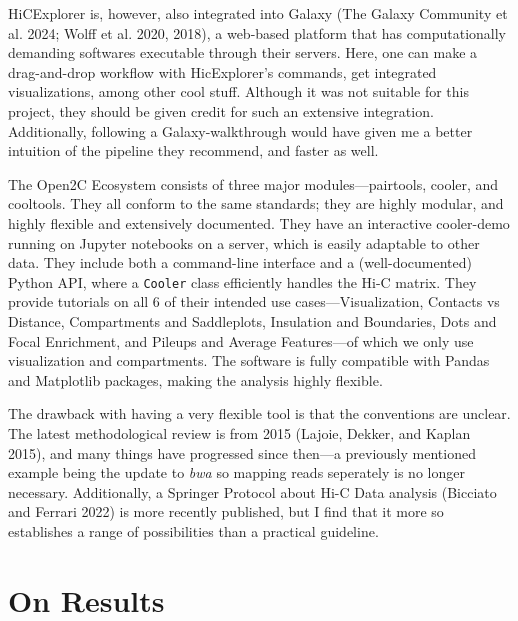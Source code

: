 \documentclass[
  11pt,
  a4paper,
]{scrbook}
\begin{document}
HiCExplorer is, however, also integrated into Galaxy (The Galaxy
Community et al. 2024; Wolff et al. 2020, 2018), a web-based platform
that has computationally demanding softwares executable through their
servers. Here, one can make a drag-and-drop workflow with HicExplorer's
commands, get integrated visualizations, among other cool stuff.
Although it was not suitable for this project, they should be given
credit for such an extensive integration. Additionally, following a
Galaxy-walkthrough would have given me a better intuition of the
pipeline they recommend, and faster as well.

The Open2C Ecosystem consists of three major modules---pairtools,
cooler, and cooltools. They all conform to the same standards; they are
highly modular, and highly flexible and extensively documented. They
have an interactive cooler-demo running on Jupyter notebooks on a
server, which is easily adaptable to other data. They include both a
command-line interface and a (well-documented) Python API, where a
\texttt{Cooler} class efficiently handles the Hi-C matrix. They provide
tutorials on all 6 of their intended use cases---Visualization, Contacts
vs Distance, Compartments and Saddleplots, Insulation and Boundaries,
Dots and Focal Enrichment, and Pileups and Average Features---of which
we only use visualization and compartments. The software is fully
compatible with Pandas and Matplotlib packages, making the analysis
highly flexible.

The drawback with having a very flexible tool is that the conventions
are unclear. The latest methodological review is from 2015 (Lajoie,
Dekker, and Kaplan 2015), and many things have progressed since then---a
previously mentioned example being the update to \emph{bwa} so mapping
reads seperately is no longer necessary. Additionally, a Springer
Protocol about Hi-C Data analysis (Bicciato and Ferrari 2022) is more
recently published, but I find that it more so establishes a range of
possibilities than a practical guideline.

\section{On Results}\label{on-results}
\end{document}
